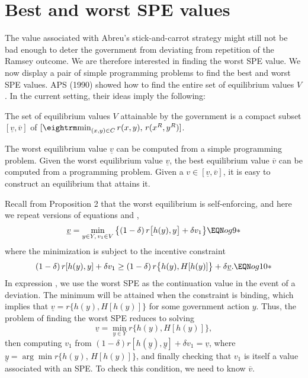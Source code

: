 \section{Best and  worst SPE values}\label{sec:best_worst}%
The value associated with
Abreu's stick-and-carrot  strategy might still not  be bad enough
to  deter the government from deviating from
repetition of the Ramsey outcome.   We are therefore interested in
finding the worst SPE value.
 We  now display a pair of simple programming problems to find the
best and worst SPE values.
   APS (1990) showed how to find the entire set of equilibrium values
$V$.   In the current setting, their ideas imply the following:

\medskip
{}  The set of equilibrium values $V$  attainable by
the government is a compact subset $[\underline v, \overline v]$
of $[{\rm min}_{(x,y)\in C}\,r(x,y),\,r(x^R,y^R)]$.

\medskip
{} The worst equilibrium value $\underline v$ can be computed from
a simple programming problem.
\medskip
{}  Given the worst equilibrium value $\underline v$, the
best equilibrium value $\overline v$ can be computed from a programming
problem.
\medskip
{}  Given a $v \in [\underline v, \overline v]$, it is easy
to construct an equilibrium  that attains it.

\medskip

Recall from Proposition 2 that the worst equilibrium is self-enforcing,
and here we repeat
versions of equations  and ,
$$\underline{v} = \min_{y\in Y,\,v_1\in V}\, \bigl\{ (1-\delta)\, r
\bigl[h(y),y\bigr] + \delta
v_1\bigr\}\EQN og9*$$
where the minimization is subject to the
incentive constraint
$$(1-\delta)\, r[h(y),y] + \delta v_1\geq (1-\delta)\, r\bigl\{ h(y),H [h(y)]
\bigr\} + \delta \underline{v} .\EQN og10*$$
In expression ,
 we use the worst SPE as the continuation value in the event of
a deviation. The minimum will be attained when the constraint is binding,
which implies that
$\underline{v} = r\{h(y), H[h(y)]\}$
for some government action $y$.
Thus, the problem of finding the worst SPE reduces to solving
$$\underline{v} = \min_{y\in Y} r\bigl\{ h(y), H[h(y)]\bigr\},$$
then computing $v_1$ from $(1-\delta) r[h(\underline y), \underline y]
+ \delta v_1 =
\underline{v}$, where $\underline y = \arg\min r\{h(y)$,
$H[h(y)]\}$, and finally checking that $v_1$ is itself
a value associated with an SPE.
 To check this condition,
we need to know $\overline v$.


